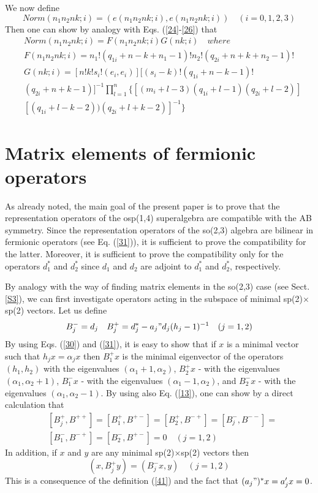 \documentclass[a4paper,12pt]{article}%
\begin{document}
We now define
\begin{equation}
Norm(n_1n_2nk;i)=(e(n_1n_2nk;i),e(n_1n_2nk;i))\quad (i=0,1,2,3)
\label{39}
\end{equation}
Then one can show by analogy with Eqs. (\ref{24}-\ref{26}) that
\begin{eqnarray}
&Norm(n_1n_2nk;i)=F(n_1n_2nk;i)G(nk;i)\quad where\nonumber\\
&F(n_1n_2nk;i)= n_1!(q_{1i}+n-k+n_1-1)!n_2!(q_{2i}+n+k+n_2-1)!\nonumber\\
&G(nk;i)=[n!k!s_i!(e_i,e_i)][(s_i-k)!(q_{1i}+n-k-1)!\nonumber\\
&(q_{2i}+n+k-1)]^{-1}\prod_{l=1}^{n} \{[(m_i+l-3)(q_{1i}+l-1)(q_{2i}+l-2)]\nonumber\\
&[(q_{1i}+l-k-2))(q_{2i}+l+k-2)]^{-1}\} 
\label{40}
\end{eqnarray}

\section{Matrix elements of fermionic operators}
\label{S5}

As already noted, the main goal of the present 
paper is to prove that the representation operators
of the osp(1,4) superalgebra are compatible with the
AB symmetry. Since the representation operators of the
so(2,3) algebra are bilinear in fermionic operators
(see Eq. (\ref{31})), it is sufficient to prove the
compatibility for the latter. Moreover, it is 
sufficient to prove the compatibility only for the
operators $d_1^*$ and $d_2^*$ since $d_1$ and $d_2$
are adjoint to $d_1^*$ and $d_2^*$, respectively.   

By analogy with the way of finding matrix elements
in the so(2,3) case (see Sect. \ref{S3}), we can 
first investigate operators acting in the
subspace of minimal sp(2)$\times$sp(2) vectors.
Let us define
\begin{equation}
B_j^-=d_j\quad B_j^+=d_j^*-a_j"d_j(h_j-1)^{-1}\quad (j=1,2)
\label{41}
\end{equation}
By using Eqs. (\ref{30}) and (\ref{31}), it is
easy to show that if $x$ is a minimal 
vector such that $h_jx=\alpha_jx$ then 
$B_1^+x$ is the minimal eigenvector of the
operators $(h_1,h_2)$ with the eigenvalues 
$(\alpha_1+1, \alpha_2)$, 
$B_2^+x$ - with the eigenvalues 
$(\alpha_1,\alpha_2+1)$, 
$B_1^-x$ - with the eigenvalues 
$(\alpha_1-1,\alpha_2)$, and $B_2^-x$ - with the 
eigenvalues $(\alpha_1,\alpha_2-1)$. By using also 
Eq. (\ref{13}), one can show by a direct calculation that
\begin{eqnarray}
&[B_j^+,B^{++}]=[B_1^+,B^{+-}]=[B_2^+,B^{-+}]=
[B_j^-,B^{--}]=\nonumber\\
&[B_1^-,B^{-+}]=[B_2^-,B^{+-}]=0\quad (j=1,2)
\label{42}
\end{eqnarray}
In addition, if $x$ and $y$ are any minimal sp(2)$\times$sp(2)
vectors then
\begin{equation}
(x,B_j^+y)=(B_j^-x,y)\quad (j=1,2)
\label{43}
\end{equation}
This is a consequence of the definition (\ref{41}) and the fact
that $(a_j")^*x=a_j'x=0$.
\end{document}
